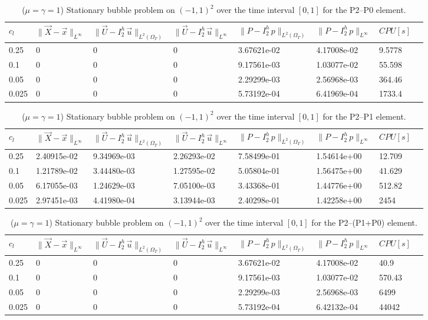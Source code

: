\documentclass[a4paper,12pt,onecolumn]{article}
\newcommand{\errorXx}{\|\vec{X} - \vec{x}\|_{L^\infty}}
\newcommand{\LerrorUu}[1]{\|\vec U - I^h_{#1}\,\vec u\|_{L^2(\Omega_T)}}
\newcommand{\errorUu}[1]{\|\vec U - I^h_{#1}\,\vec u\|_{L^\infty}}
\newcommand{\errorPp}[1]{\|P - I^h_{#1}\,p\|_{L^\infty}}
\newcommand{\LerrorPp}[1]{\|P - I^h_{#1}\,p\|_{L^2(\Omega_T)}}
\begin{document}
\begin{table}
 \center
 \hspace*{-2cm}
\begin{tabular}{llllllll}
\hline
$c_l$ & $\errorXx$ & $\LerrorUu2$ & $\errorUu2$ & $\LerrorPp2$ & $\errorPp2$ & $CPU[s]$ \\
\hline
0.25 & 0 & 0 & 0 & 3.67621e-02 & 4.17008e-02 & 9.5778\\
0.1 & 0 & 0 & 0 & 9.17561e-03 & 1.03077e-02 & 55.598\\
0.05 & 0 & 0 & 0 & 2.29299e-03 & 2.56968e-03 & 364.46\\
0.025 & 0 & 0 & 0 & 5.73192e-04 & 6.41969e-04 & 1733.4\\
\hline
\end{tabular}
\hspace*{-2cm}
\caption{($\mu=\gamma=1$) Stationary bubble problem on $(-1,1)^2$ over the time interval $[0,1]$ for the P2--P0 element.}
\label{tab:bubble2Dp2p0}
\end{table}

\begin{table}
 \center
 \hspace*{-2cm}
\begin{tabular}{llllllll}
\hline
$c_l$ & $\errorXx$ & $\LerrorUu2$ & $\errorUu2$ & $\LerrorPp2$ & $\errorPp2$ & $CPU[s]$ \\
\hline
0.25 & 2.40915e-02 & 9.34969e-03 & 2.26293e-02 & 7.58499e-01 & 1.54614e+00 & 12.709\\
0.1 & 1.21789e-02 & 3.44480e-03 & 1.27595e-02 & 5.05804e-01 & 1.56475e+00 & 41.629\\
0.05 & 6.17055e-03 & 1.24629e-03 & 7.05100e-03 & 3.43368e-01 & 1.44776e+00 & 512.82\\
0.025 & 2.97451e-03 & 4.41980e-04 & 3.13944e-03 & 2.40298e-01 & 1.42258e+00 & 2454\\
\hline
\end{tabular}
\hspace*{-2cm}
\caption{($\mu=\gamma=1$) Stationary bubble problem on $(-1,1)^2$ over the time interval $[0,1]$ for the P2--P1 element.}
\label{tab:bubble2Dp2p1}
\end{table}

\begin{table}
 \center
 \hspace*{-2cm}
\begin{tabular}{llllllll}
\hline
$c_l$ & $\errorXx$ & $\LerrorUu2$ & $\errorUu2$ & $\LerrorPp2$ & $\errorPp2$ & $CPU[s]$ \\
\hline
0.25 & 0 & 0 & 0 & 3.67621e-02 & 4.17008e-02 & 40.9\\
0.1 & 0 & 0 & 0 & 9.17561e-03 & 1.03077e-02 & 570.43\\
0.05 & 0 & 0 & 0 & 2.29299e-03 & 2.56968e-03 & 6499\\
0.025 & 0 & 0 & 0 & 5.73192e-04 & 6.42132e-04 & 44042\\
\hline
\end{tabular}
\hspace*{-2cm}
\caption{($\mu=\gamma=1$) Stationary bubble problem on $(-1,1)^2$ over the time interval $[0,1]$ for the P2--(P1+P0) element.}
\label{tab:bubble2Dp2p1p0}
\end{table}
\end{document}

